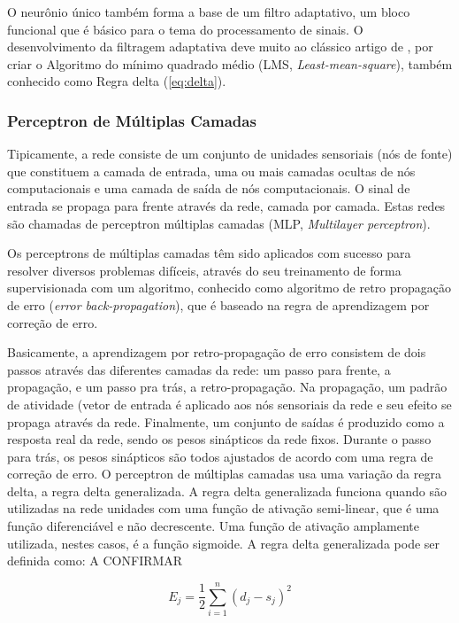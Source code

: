 O neurônio único também forma a base de um filtro adaptativo, um bloco funcional que é básico para o tema do processamento de sinais. O desenvolvimento da filtragem adaptativa deve muito ao clássico artigo de , por criar o Algoritmo do mínimo quadrado médio (LMS, \textit{Least-mean-square}), também conhecido como Regra delta (\autoref{eq:delta}).

\subsubsection{Perceptron de Múltiplas Camadas}
Tipicamente, a rede consiste de um conjunto de unidades sensoriais (nós de fonte) que constituem a camada de entrada, uma ou mais camadas ocultas de nós computacionais e uma camada de saída de nós computacionais. O sinal de entrada se propaga para frente através da rede, camada por camada. Estas redes são chamadas de perceptron múltiplas camadas (MLP, \textit{Multilayer perceptron}). 

Os perceptrons de múltiplas camadas têm sido aplicados com sucesso para resolver diversos problemas difíceis, através do seu treinamento de forma supervisionada com um algoritmo, conhecido como algoritmo de retro propagação de erro (\textit{error back-propagation}), que é baseado na regra de aprendizagem por correção de erro. 

Basicamente, a aprendizagem por retro-propagação de erro consistem de dois passos através das diferentes camadas da rede: um passo para frente, a propagação, e um passo pra trás, a retro-propagação. Na propagação, um padrão de atividade (vetor de entrada é aplicado aos nós sensoriais da rede e seu efeito se propaga através da rede. Finalmente, um conjunto de saídas é produzido como a resposta real da rede, sendo os pesos sinápticos da rede fixos. Durante o passo para trás, os pesos sinápticos são todos ajustados de acordo com uma regra de correção de erro. O perceptron de múltiplas camadas usa uma variação da regra delta, a regra delta generalizada. A regra delta generalizada funciona quando são utilizadas na rede unidades com uma função de ativação semi-linear, que é uma função diferenciável e não decrescente. Uma função de ativação amplamente utilizada, nestes casos, é a função sigmoide. A regra delta generalizada pode ser definida como: {\color{red} A CONFIRMAR}

\begin{equation}
    E_{j} = \frac{1}{2} \sum_{i=1}^{n} (d_{j} - s_{j})^{2}
\end{equation}


